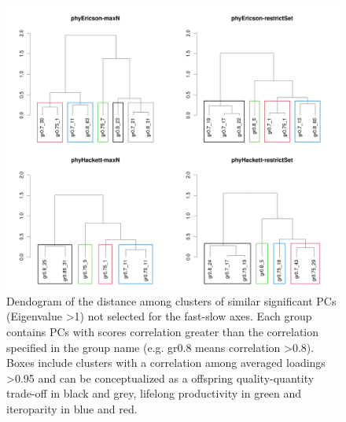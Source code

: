 \begin{figure}[ht!]
\centering
\includegraphics[width=.8\textwidth]{./Figures/Appendix2_1/2nd axes trees-1.png}
\caption[Cluster dendogram of the secondary axes]{
Dendogram of the distance among clusters of similar significant PCs (Eigenvalue
\textgreater{1}) not selected for the fast-slow axes. Each group contains PCs
with scores correlation greater than the correlation specified in the group name
(e.g. gr0.8 means correlation \textgreater{0.8}). Boxes include clusters with a
correlation among averaged loadings \textgreater{0.95} and can be conceptualized
as a offspring quality-quantity trade-off in black and grey, lifelong
productivity in green and iteroparity in blue and red.}
\label{fig:figApp2.5}
\end{figure}
